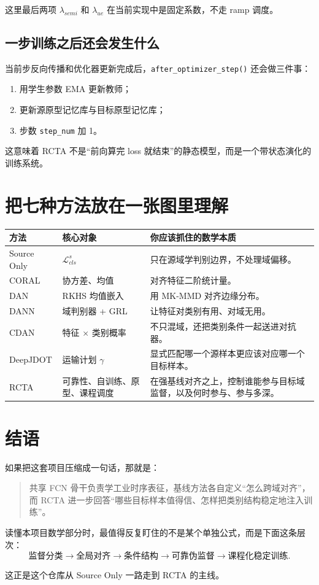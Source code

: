 \documentclass[12pt,a4paper]{ctexart}
\begin{document}
这里最后两项 $\lambda_{semi}$ 和 $\lambda_{ue}$ 在当前实现中是固定系数，不走 ramp 调度。

\subsection{一步训练之后还会发生什么}

当前步反向传播和优化器更新完成后，\texttt{after\_optimizer\_step()} 还会做三件事：
\begin{enumerate}[leftmargin=2em]
  \item 用学生参数 EMA 更新教师；
  \item 更新源原型记忆库与目标原型记忆库；
  \item 步数 \texttt{step\_num} 加 1。
\end{enumerate}

这意味着 RCTA 不是“前向算完 loss 就结束”的静态模型，而是一个带状态演化的训练系统。

\section{把七种方法放在一张图里理解}

\begin{center}
\begin{tabular}{p{2.5cm}p{4.5cm}p{6.5cm}}
\toprule
方法 & 核心对象 & 你应该抓住的数学本质 \\
\midrule
Source Only & $\mathcal{L}_{cls}^s$ & 只在源域学判别边界，不处理域偏移。 \\
CORAL & 协方差、均值 & 对齐特征二阶统计量。 \\
DAN & RKHS 均值嵌入 & 用 MK-MMD 对齐边缘分布。 \\
DANN & 域判别器 + GRL & 让特征对类别有用、对域无用。 \\
CDAN & 特征 $\times$ 类别概率 & 不只混域，还把类别条件一起送进对抗器。 \\
DeepJDOT & 运输计划 $\gamma$ & 显式匹配哪一个源样本更应该对应哪一个目标样本。 \\
RCTA & 可靠性、自训练、原型、课程调度 & 在强基线对齐之上，控制谁能参与目标域监督，以及何时参与、参与多深。 \\
\bottomrule
\end{tabular}
\end{center}

\section{结语}

如果把这套项目压缩成一句话，那就是：
\begin{quote}
共享 FCN 骨干负责学工业时序表征，基线方法各自定义“怎么跨域对齐”，而 RCTA 进一步回答“哪些目标样本值得信、怎样把类别结构稳定地注入训练”。
\end{quote}

读懂本项目数学部分时，最值得反复盯住的不是某个单独公式，而是下面这条层次：
\begin{equation}
\text{监督分类}
\rightarrow
\text{全局对齐}
\rightarrow
\text{条件结构}
\rightarrow
\text{可靠伪监督}
\rightarrow
\text{课程化稳定训练}.
\end{equation}

这正是这个仓库从 Source Only 一路走到 RCTA 的主线。
\end{document}
